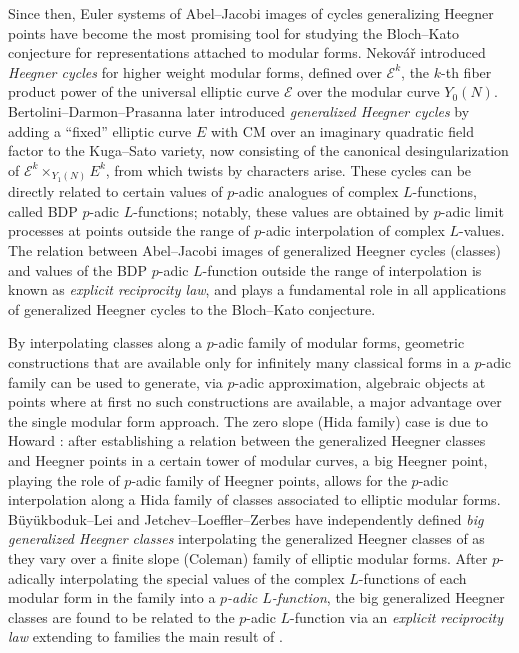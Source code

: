 \documentclass[a4paper]{amsart}
\numberwithin{equation}{section}
\theoremstyle{definition}
\begin{document}
Since then, Euler systems of Abel--Jacobi images of cycles generalizing Heegner points have become the most promising tool for studying the Bloch--Kato conjecture for representations attached to modular forms. Neková\v{r} \cite{Nekovar.Kolyvagin, Nekovar.HeegnerCycles} introduced \textit{Heegner cycles} for higher weight modular forms, defined over $\mathcal{E}^k$, the $k$-th fiber product power of the universal elliptic curve $\mathcal{E}$ over the modular curve $Y_0(N)$. Bertolini--Darmon--Prasanna \cite{BertoliniDarmonPrasanna} later introduced \textit{generalized Heegner cycles} by adding a ``fixed'' elliptic curve $E$ with CM over an imaginary quadratic field factor to the Kuga--Sato variety, now consisting of the canonical desingularization of $\mathcal{E}^k\times_{Y_1(N)} E^k$, from which twists by characters arise. These cycles can be directly related to certain values of $p$-adic analogues of complex $L$-functions, called BDP $p$-adic $L$-functions; notably, these values are obtained by $p$-adic limit processes at points outside the range of $p$-adic interpolation of complex $L$-values. The relation between Abel--Jacobi images of generalized Heegner cycles (classes) and values of the BDP $p$-adic $L$-function outside the range of interpolation is known as \textit{explicit reciprocity law}, and plays a fundamental role in all applications of generalized Heegner cycles to the Bloch--Kato conjecture.

By interpolating classes along a $p$-adic family of modular forms,  geometric constructions that are available only for infinitely many classical forms in a $p$-adic family can be used to generate, via $p$-adic approximation, algebraic objects at points where at first no such constructions are available, a major advantage over the single modular form approach. The zero slope (Hida family) case is due to Howard \cite{Howard}: after establishing a relation between the generalized Heegner classes and Heegner points in a certain tower of modular curves, a big Heegner point, playing the role of $p$-adic family of Heegner points, allows for the $p$-adic interpolation along a Hida family of classes associated to elliptic modular forms. Büyükboduk--Lei \cite{BuyukbodukLei} and Jetchev--Loeffler--Zerbes \cite{JetchevLoefflerZerbes} have independently defined \textit{big generalized Heegner classes} interpolating the generalized Heegner classes of \cite{BertoliniDarmonPrasanna} as they vary over a finite slope (Coleman) family of elliptic modular forms. After $p$-adically interpolating the special values of the complex $L$-functions of each modular form in the family into a \textit{$p$-adic $L$-function}, the big generalized Heegner classes are found to be related to the $p$-adic $L$-function via an \textit{explicit reciprocity law} extending to families the main result of \cite{BertoliniDarmonPrasanna}.
\end{document}
